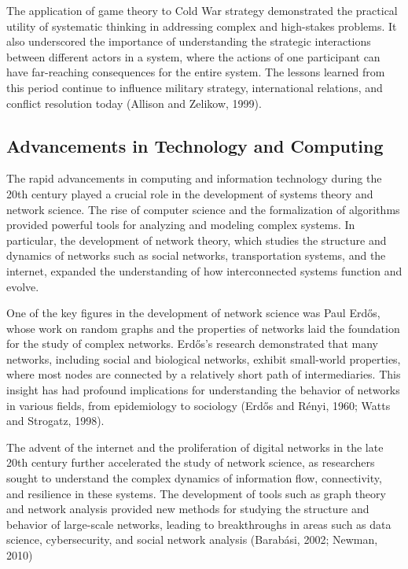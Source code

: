 \documentclass[twocolumn]{article}
\begin{document}
\textcolor{secondary}{The application of game theory to Cold War strategy demonstrated the practical utility of systematic thinking in addressing complex and high-stakes problems. It also underscored the importance of understanding the strategic interactions between different actors in a system, where the actions of one participant can have far-reaching consequences for the entire system. The lessons learned from this period continue to influence military strategy, international relations, and conflict resolution today (Allison and Zelikow, 1999).}

\subsection{Advancements in Technology and Computing}

\textcolor{primary}{The rapid advancements in computing and information technology during the 20th century played a crucial role in the development of systems theory and network science. The rise of computer science and the formalization of algorithms provided powerful tools for analyzing and modeling complex systems. In particular, the development of network theory, which studies the structure and dynamics of networks such as social networks, transportation systems, and the internet, expanded the understanding of how interconnected systems function and evolve.}

\textcolor{secondary}{One of the key figures in the development of network science was Paul Erdős, whose work on random graphs and the properties of networks laid the foundation for the study of complex networks. Erdős’s research demonstrated that many networks, including social and biological networks, exhibit small-world properties, where most nodes are connected by a relatively short path of intermediaries. This insight has had profound implications for understanding the behavior of networks in various fields, from epidemiology to sociology (Erdős and Rényi, 1960; Watts and Strogatz, 1998).}

\textcolor{primary}{The advent of the internet and the proliferation of digital networks in the late 20th century further accelerated the study of network science, as researchers sought to understand the complex dynamics of information flow, connectivity, and resilience in these systems. The development of tools such as graph theory and network analysis provided new methods for studying the structure and behavior of large-scale networks, leading to breakthroughs in areas such as data science, cybersecurity, and social network analysis (Barabási, 2002; Newman, 2010)}
\end{document}
